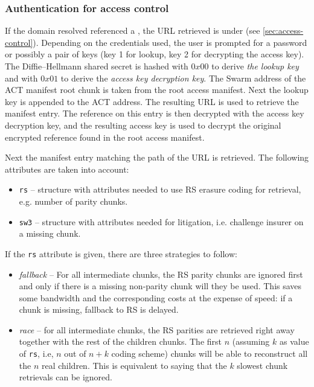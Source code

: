 \subsubsection{Authentication for access control}

If the domain resolved referenced a , the URL retrieved is under  (see \ref{sec:access-control}). 
Depending on the credentials used, the user is prompted for a password or possibly a pair of keys (key 1 for lookup, key 2 for decrypting the access key). 
The Diffie--Hellmann shared secret is hashed with $0x00$ to derive \emph{the lookup key} and with $0x01$ to derive the \emph{access key decryption key}. The Swarm address of the ACT manifest root chunk is taken from the root access manifest. 
Next the lookup key is appended to the ACT address. The resulting URL is used to retrieve the manifest entry. The reference on this entry is then decrypted with the access key decryption key, and the resulting access key is used to decrypt the original encrypted reference found in the root access manifest.

Next the manifest entry matching the path of the URL is retrieved. The following attributes are taken into account:


\begin{itemize}[noitemsep]
    \item \lstinline{rs} -- {
    structure with attributes needed to use RS erasure coding for retrieval, e.g. number of parity chunks}.
    \item \lstinline{sw3} -- { structure with attributes needed for litigation, i.e. challenge insurer on a missing chunk}. 
\end{itemize}


If the \lstinline{rs} attribute is given, there are three strategies to follow: 


\begin{itemize}[noitemsep]
\item \emph{fallback} -- For all intermediate chunks, the RS parity chunks are ignored first and only if there is a missing non-parity chunk will they be used. This saves some bandwidth and the corresponding costs at the expense of speed: if a chunk is missing, fallback to RS is delayed.
\item \emph{race} -- for all intermediate chunks, the RS parities are retrieved right away together with the rest of the children chunks. The first $n$ (assuming $k$ as value of \lstinline{rs}, i.e, $n$ out of $n+k$ coding scheme) chunks will be able to reconstruct all the $n$ real children. This is equivalent to saying that the $k$ slowest chunk retrievals can be ignored.  
\end{itemize}

